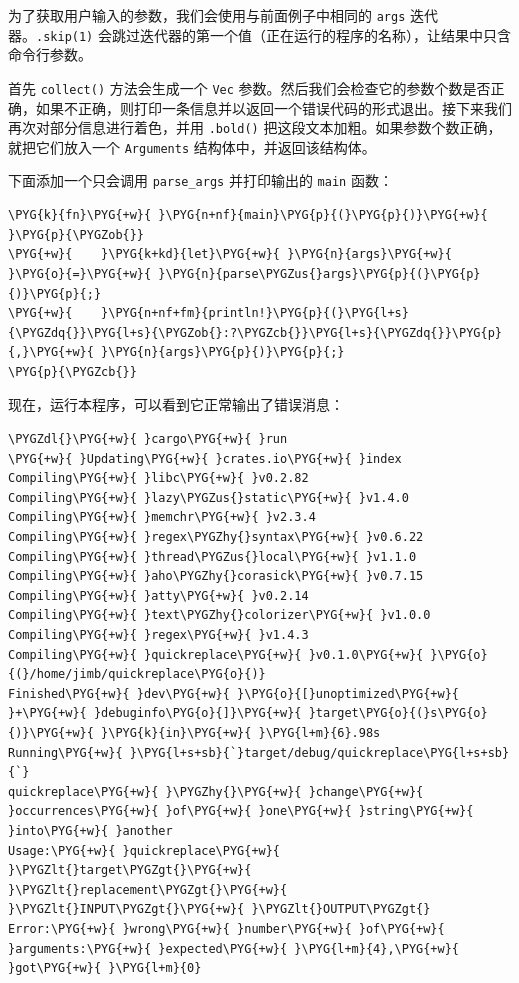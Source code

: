 为了获取用户输入的参数，我们会使用与前面例子中相同的 \texttt{args} 迭代器。\texttt{.skip(1)} 会跳过迭代器的第一个值（正在运行的程序的名称），让结果中只含命令行参数。

首先 \texttt{collect()} 方法会生成一个 \texttt{Vec} 参数。然后我们会检查它的参数个数是否正确，如果不正确，则打印一条信息并以返回一个错误代码的形式退出。接下来我们再次对部分信息进行着色，并用 \texttt{.bold()} 把这段文本加粗。如果参数个数正确，就把它们放入一个 \texttt{Arguments} 结构体中，并返回该结构体。

下面添加一个只会调用 \texttt{parse\_args} 并打印输出的 \texttt{main} 函数：

\begin{Verbatim}[commandchars=\\\{\},breaklines=true,breakanywhere=true,fontsize=\codefont,xleftmargin=17bp]
\PYG{k}{fn}\PYG{+w}{ }\PYG{n+nf}{main}\PYG{p}{(}\PYG{p}{)}\PYG{+w}{ }\PYG{p}{\PYGZob{}}
\PYG{+w}{    }\PYG{k+kd}{let}\PYG{+w}{ }\PYG{n}{args}\PYG{+w}{ }\PYG{o}{=}\PYG{+w}{ }\PYG{n}{parse\PYGZus{}args}\PYG{p}{(}\PYG{p}{)}\PYG{p}{;}
\PYG{+w}{    }\PYG{n+nf+fm}{println!}\PYG{p}{(}\PYG{l+s}{\PYGZdq{}}\PYG{l+s}{\PYGZob{}:?\PYGZcb{}}\PYG{l+s}{\PYGZdq{}}\PYG{p}{,}\PYG{+w}{ }\PYG{n}{args}\PYG{p}{)}\PYG{p}{;}
\PYG{p}{\PYGZcb{}}
\end{Verbatim}

现在，运行本程序，可以看到它正常输出了错误消息：

\begin{Verbatim}[commandchars=\\\{\},breaklines=true,breakanywhere=true,fontsize=\codefont,xleftmargin=17bp]
\PYGZdl{}\PYG{+w}{ }cargo\PYG{+w}{ }run
\PYG{+w}{ }Updating\PYG{+w}{ }crates.io\PYG{+w}{ }index
Compiling\PYG{+w}{ }libc\PYG{+w}{ }v0.2.82
Compiling\PYG{+w}{ }lazy\PYGZus{}static\PYG{+w}{ }v1.4.0
Compiling\PYG{+w}{ }memchr\PYG{+w}{ }v2.3.4
Compiling\PYG{+w}{ }regex\PYGZhy{}syntax\PYG{+w}{ }v0.6.22
Compiling\PYG{+w}{ }thread\PYGZus{}local\PYG{+w}{ }v1.1.0
Compiling\PYG{+w}{ }aho\PYGZhy{}corasick\PYG{+w}{ }v0.7.15
Compiling\PYG{+w}{ }atty\PYG{+w}{ }v0.2.14
Compiling\PYG{+w}{ }text\PYGZhy{}colorizer\PYG{+w}{ }v1.0.0
Compiling\PYG{+w}{ }regex\PYG{+w}{ }v1.4.3
Compiling\PYG{+w}{ }quickreplace\PYG{+w}{ }v0.1.0\PYG{+w}{ }\PYG{o}{(}/home/jimb/quickreplace\PYG{o}{)}
Finished\PYG{+w}{ }dev\PYG{+w}{ }\PYG{o}{[}unoptimized\PYG{+w}{ }+\PYG{+w}{ }debuginfo\PYG{o}{]}\PYG{+w}{ }target\PYG{o}{(}s\PYG{o}{)}\PYG{+w}{ }\PYG{k}{in}\PYG{+w}{ }\PYG{l+m}{6}.98s
Running\PYG{+w}{ }\PYG{l+s+sb}{`}target/debug/quickreplace\PYG{l+s+sb}{`}
quickreplace\PYG{+w}{ }\PYGZhy{}\PYG{+w}{ }change\PYG{+w}{ }occurrences\PYG{+w}{ }of\PYG{+w}{ }one\PYG{+w}{ }string\PYG{+w}{ }into\PYG{+w}{ }another
Usage:\PYG{+w}{ }quickreplace\PYG{+w}{ }\PYGZlt{}target\PYGZgt{}\PYG{+w}{ }\PYGZlt{}replacement\PYGZgt{}\PYG{+w}{ }\PYGZlt{}INPUT\PYGZgt{}\PYG{+w}{ }\PYGZlt{}OUTPUT\PYGZgt{}
Error:\PYG{+w}{ }wrong\PYG{+w}{ }number\PYG{+w}{ }of\PYG{+w}{ }arguments:\PYG{+w}{ }expected\PYG{+w}{ }\PYG{l+m}{4},\PYG{+w}{ }got\PYG{+w}{ }\PYG{l+m}{0}
\end{Verbatim}

